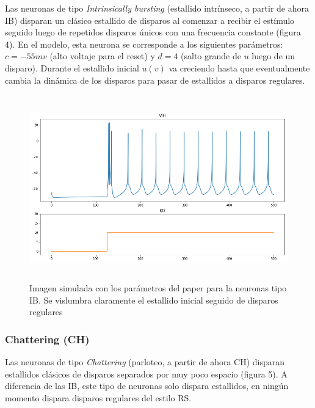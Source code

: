 \documentclass[12pt]{article}
\begin{document}
Las neuronas de tipo \textit{Intrinsically bursting} (estallido intrínseco, a partir de ahora IB)
disparan un clásico estallido de disparos al comenzar a recibir el estímulo seguido luego de repetidos disparos únicos con una frecuencia constante (figura 4).
En el modelo, esta neurona se corresponde a los siguientes parámetros: $c = -55 mv$ (alto voltaje para el reset) y $d = 4$ (salto grande de $u$ luego de un disparo).
Durante el estallido inicial $u(v)$ va creciendo hasta que eventualmente cambia la dinámica de los disparos para pasar de estallidos a disparos regulares. \\


\begin{figure}[h!]
    \centering
        \includegraphics[height=8cm]{images/IB.png}
    \caption[fontsize=2pt]{Imagen simulada con los parámetros del paper para la neuronas tipo IB. Se vislumbra claramente el estallido inicial seguido de disparos regulares}
\end{figure}
\newpage

 \subsubsection{Chattering (CH)}

 Las neuronas de tipo \textit{Chattering} (parloteo, a partir de ahora CH) disparan estallidos clásicos de disparos separados por muy poco espacio (figura 5). A diferencia de las IB, este tipo de neuronas solo dispara estallidos, en ningún momento dispara disparos regulares del estilo RS.
\end{document}
